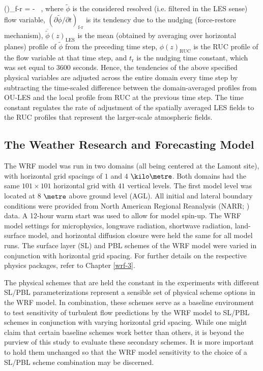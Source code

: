 \be
\left(\right)_{\textrm{f-r}} = -  \mbox{ ,}
\ee
\noindent
where $\tilde{\phi}$ is the considered resolved (i.e. filtered in the LES sense) flow variable, $\left(\partial \tilde{\phi} / \partial t\right)_{\textrm{f-r}}$ is its tendency due to the nudging (force-restore mechanism), $\overline{\tilde{\phi}}(z)_{\textrm{LES}}$ is the mean (obtained by averaging over horizontal planes) profile of $\tilde{\phi}$ from the preceding time step, $\phi(z)_{\textrm{RUC}}$ is the RUC profile of the flow variable at that time step, and $t_{\textrm{r}}$ is the nudging time constant, which was set equal to $3600$ seconds. Hence, the tendencies of the above specified physical variables are adjusted across the entire domain every time step by subtracting the time-scaled difference between the domain-averaged profiles from OU-LES and the local profile from RUC at the previous time step. The time constant regulates the rate of adjustment of the spatially averaged LES fields to the RUC profiles that represent the larger-scale atmospheric fields.

\subsection{The Weather Research and Forecasting Model}
\label{wrf-412}

The WRF model was run in two domains (all being centered at the Lamont site), with horizontal grid spacings of $1$ and $4$ $\kilo\metre$. Both domains had the same $101\times101$ horizontal grid with $41$ vertical levels. The first model level was located at 8 $\metre$ above ground level (AGL). All initial and lateral boundary conditions were provided from North American Regional Reanalysis (NARR; \citealt{NARR}) data. A 12-hour warm start was used to allow for model spin-up. The WRF model settings for microphysics, longwave radiation, shortwave radiation, land-surface model, and horizontal diffusion closure were held the same for all model runs. The surface layer (SL) and PBL schemes of the WRF model were varied in conjunction with horizontal grid spacing. For further details on the respective physics packages, refer to Chapter \autoref{wrf-3}.

The physical schemes that are held the constant in the experiments with different SL\slash PBL parameterizations represent a sensible set of physical scheme options in the WRF model. In combination, these schemes serve as a baseline environment to test sensitivity of turbulent flow predictions by the WRF model to SL\slash PBL schemes in conjunction with varying horizontal grid spacing. While one might claim that certain baseline schemes work better than others, it is beyond the purview of this study to evaluate these secondary schemes. It is more important to hold them unchanged so that the WRF model sensitivity to the choice of a SL\slash PBL scheme combination may be discerned.

